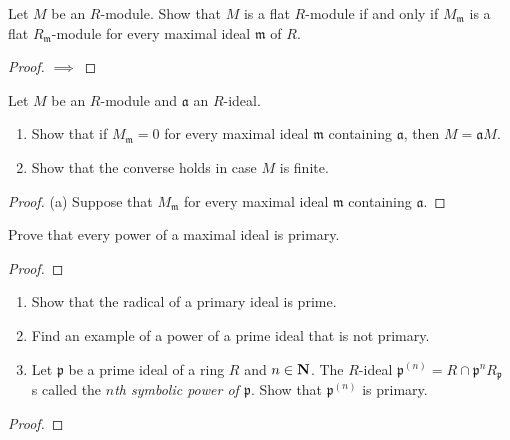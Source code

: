 \newpage
\begin{problem}
Let $M$ be an $R$-module. Show that $M$ is a flat $R$-module if
and only if $M_{\mathfrak{m}}$ is a flat
$R_{\mathfrak{m}}$-module for every maximal ideal $\mathfrak{m}$
of $R$.
\end{problem}
\begin{proof}
$\implies$
\end{proof}
\newpage
\begin{problem}
Let $M$ be an $R$-module and $\mathfrak{a}$ an $R$-ideal.
\begin{enumerate}[noitemsep,label=(\alph*)]
\item Show that if $M_{\mathfrak{m}}=0$ for every maximal ideal
  $\mathfrak{m}$ containing $\mathfrak{a}$, then $M=\mathfrak{a}M$.
\item Show that the converse holds in case $M$ is finite.
\end{enumerate}
\end{problem}
\begin{proof}
(a) Suppose that $M_{\mathfrak{m}}$ for every maximal ideal
$\mathfrak{m}$ containing $\mathfrak{a}$.
\end{proof}
\newpage
\begin{problem}
Prove that every power of a maximal ideal is primary.
\end{problem}
\begin{proof}
\end{proof}
\newpage
\begin{problem}
\begin{enumerate}[noitemsep,label=(\alph*)]
\item Show that the radical of a primary ideal is prime.
\item Find an example of a power of a prime ideal that is not
  primary.
\item Let $\mathfrak{p}$ be a prime ideal of a ring $R$ and
  $n\in\mathbf{N}$. The $R$-ideal
  $\mathfrak{p}^{(n)}=R\cap\mathfrak{p}^nR_{\mathfrak{p}}$ s
  called the \emph{$n$th symbolic power of $\mathfrak{p}$}. Show
  that $\mathfrak{p}^{(n)}$ is primary.
\end{enumerate}
\end{problem}
\begin{proof}
\end{proof}

